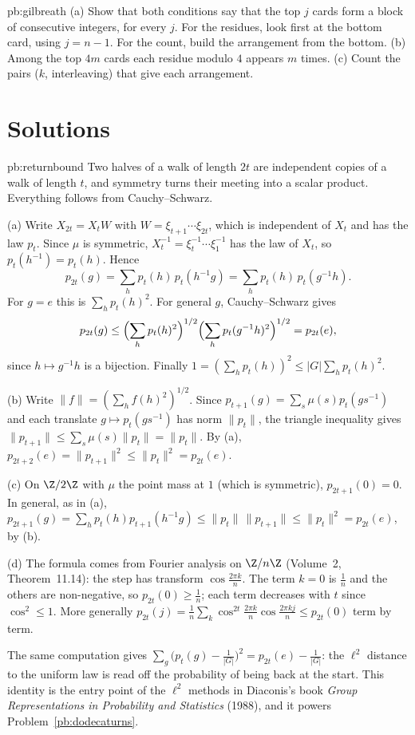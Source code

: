 \begin{hint}{pb:gilbreath}
(a) Show that both conditions say that the top $j$ cards form a block of consecutive integers, for every $j$. For the residues, look first at the
bottom card, using $j=n-1$. For the count, build the arrangement from the bottom. (b) Among the top $4m$ cards each residue modulo $4$ appears $m$ times. (c) Count the pairs ($k$, interleaving)
that give each arrangement.
\end{hint}

\section{Solutions}

\begin{solution}{pb:returnbound}
\idea Two halves of a walk of length $2t$ are independent copies of a walk of length $t$, and symmetry turns their meeting into a scalar
product. Everything follows from Cauchy--Schwarz.

\writeup (a) Write $X_{2t}=X_tW$ with $W=\xi_{t+1}\cdots\xi_{2t}$, which is independent of $X_t$ and has the law $p_t$. Since $\mu$ is symmetric,
$X_t^{-1}=\xi_t^{-1}\cdots\xi_1^{-1}$ has the law of $X_t$, so $p_t(h^{-1})=p_t(h)$. Hence
\[
p_{2t}(g)=\sum_hp_t(h)\,p_t(h^{-1}g)=\sum_hp_t(h)\,p_t(g^{-1}h).
\]
For $g=e$ this is $\sum_hp_t(h)^2$. For general $g$, Cauchy--Schwarz gives
\[
p_{2t}(g)\le\Bigl(\sum_hp_t(h)^2\Bigr)^{1/2}\Bigl(\sum_hp_t(g^{-1}h)^2\Bigr)^{1/2}=p_{2t}(e),
\]
since $h\mapsto g^{-1}h$ is a bijection. Finally $1=(\sum_hp_t(h))^2\le|G|\sum_hp_t(h)^2$.

(b) Write $\|f\|=(\sum_hf(h)^2)^{1/2}$. Since $p_{t+1}(g)=\sum_s\mu(s)p_t(gs^{-1})$ and each translate $g\mapsto p_t(gs^{-1})$ has norm $\|p_t\|$, the triangle inequality gives
$\|p_{t+1}\|\le\sum_s\mu(s)\|p_t\|=\|p_t\|$. By (a), $p_{2t+2}(e)=\|p_{t+1}\|^2\le\|p_t\|^2=p_{2t}(e)$.

(c) On $\Z/2\Z$ with $\mu$ the point mass at $1$ (which is symmetric), $p_{2t+1}(0)=0$. In general, as in (a),
$p_{2t+1}(g)=\sum_hp_t(h)p_{t+1}(h^{-1}g)\le\|p_t\|\,\|p_{t+1}\|\le\|p_t\|^2=p_{2t}(e)$, by (b).

(d) The formula comes from Fourier analysis on $\Z/n\Z$ (Volume~2, Theorem~11.14): the step has transform $\cos\frac{2\pi k}n$. The term $k=0$ is $\frac1n$ and the
others are non-negative, so $p_{2t}(0)\ge\frac1n$; each term decreases with $t$ since $\cos^2\le1$. More generally
$p_{2t}(j)=\frac1n\sum_k\cos^{2t}\frac{2\pi k}n\cos\frac{2\pi kj}n\le p_{2t}(0)$ term by term.

\leads The same computation gives $\sum_g\bigl(p_t(g)-\frac1{|G|}\bigr)^2=p_{2t}(e)-\frac1{|G|}$: the $\ell^2$ distance to the uniform law is read off the
probability of being back at the start. This identity is the entry point of the $\ell^2$ methods in Diaconis's book \emph{Group
Representations in Probability and Statistics} (1988), and it powers Problem~\ref{pb:dodecaturns}.
\end{solution}


